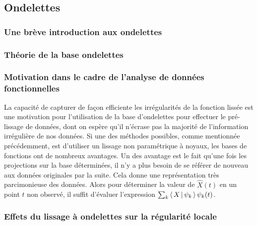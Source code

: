 

\subsection{Ondelettes}
\subsubsection{Une brève introduction aux ondelettes}



\subsubsection{Théorie de la base ondelettes}




\subsubsection{Motivation dans le cadre de l'analyse de données fonctionnelles}

La capacité de capturer de façon efficiente les irrégularités de la fonction lissée est une motivation pour l'utilisation de la base d'ondelettes pour effectuer le pré-lissage de données, dont on espère qu'il n'écrase pas la majorité de l'information irrégulière de nos données. Si une des méthodes possibles, comme mentionnée précédemment, est d'utiliser un lissage non paramétrique à noyaux, les bases de fonctions ont de nombreux avantages. Un des avantage est le fait qu'une fois les projections sur la base déterminées, il n'y a plus besoin de se référer de nouveau aux données originales par la suite. Cela donne une représentation très parcimonieuse des données. Alors pour déterminer la valeur de $\widehat X(t)$ en un point $t$ non observé, il suffit d'évaluer l'expression $\sum_k \left\langle \, X \, \vert \, \psi_k \, \right\rangle \psi_k(t)$.

\subsubsection{Effets du lissage à ondelettes sur la régularité locale}


